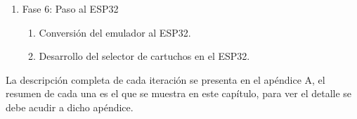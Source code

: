 \documentclass[../main.tex]{subfiles}
\begin{document}
\begin{enumerate}
		\item Fase 6: Paso al ESP32
		\begin{enumerate}
			\item Conversión del emulador al ESP32.
			\item Desarrollo del selector de cartuchos en el ESP32.
		\end{enumerate}
	\end{enumerate}
	
	La descripción completa de cada iteración se presenta en el apéndice A, el resumen de cada una es el que se muestra en este capítulo, para ver el detalle se debe acudir a dicho apéndice.

\clearpage







\end{document}
